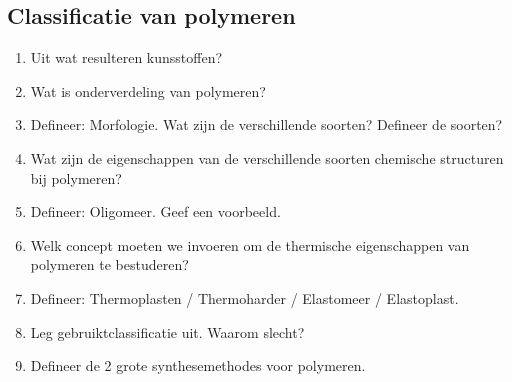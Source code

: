 \documentclass[a4paper,12pt]{article}
\begin{document}
    \subsection*{Classificatie van polymeren}
    \begin{enumerate}
        \item Uit wat resulteren kunsstoffen?
        \item Wat is onderverdeling van polymeren?
        \item Defineer: Morfologie. Wat zijn de verschillende soorten? Defineer de soorten?
        \item Wat zijn de eigenschappen van de verschillende soorten chemische structuren bij polymeren?
        \item Defineer: Oligomeer. Geef een voorbeeld.
        \item Welk concept moeten we invoeren om de thermische eigenschappen van polymeren te bestuderen?
        \item Defineer: Thermoplasten / Thermoharder / Elastomeer / Elastoplast.
        \item Leg gebruiktclassificatie uit. Waarom slecht?
        \item Defineer de 2 grote synthesemethodes voor polymeren.
    \end{enumerate}
\end{document}

